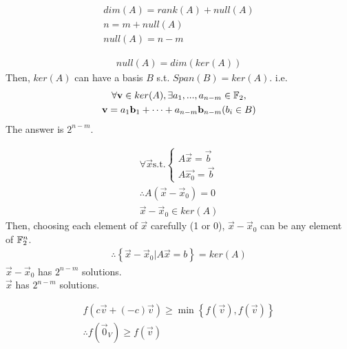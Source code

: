 \documentclass[1]{mathtoolkit}
\begin{document}
\maketitle

\begin{p}
  \item
    \begin{subp}
      \item
        \begin{gather}
          dim(A) = rank(A) + null(A) \\
          n = m + null(A) \\
          null(A) = n - m
        \end{gather}
      \item
        \begin{gather}
          null(A) = dim(ker(A))
        \end{gather}
        Then, $ker(A)$ can have a basis $B$ s.t. $Span(B) = ker(A)$.
        i.e.
        \begin{gather}
          \forall \mathbf{v} \in ker(A),
          \exists a_1, ..., a_{n-m} \in \mathbb{F}_2, \\
          \mathbf{v} = a_1 \mathbf{b}_1 + \dots + a_{n-m} \mathbf{b}_{n-m} (b_i \in B)
        \end{gather}
        \therefore The answer is $2^{n-m}$.
      \item
        \begin{gather}
          \forall \vec{x}
          \text{s.t.}
          \begin{cases}
            A \vec{x} = \vec{b} \\
            A \vec{x_0} = \vec{b}
          \end{cases} \\
          \therefore A (\vec{x} - \vec{x}_0) = 0 \\
          \vec{x} - \vec{x}_0 \in ker(A)
        \end{gather}
        Then, choosing each element of $\vec{x}$ carefully (1 or 0),
        $\vec{x} - \vec{x}_0$ can be any element of $\mathbb{F}^n_2$.
        \begin{gather}
          \therefore \left\{ \vec{x} - \vec{x}_0 | A \vec{x} = b \right\} = ker(A)
        \end{gather}
        \therefore $\vec{x} - \vec{x}_0$ has $2^{n-m}$ solutions. \\
        \therefore $\vec{x}$ has $2^{n-m}$ solutions. \\
    \end{subp}

  \item
    \begin{subp}
      \begin{gather}
        f(c \vec{v} + (-c) \vec{v}) \ge \min \left\{ f(\vec{v}), f(\vec{v}) \right\} \\
        \therefore f(\vec{0}_V) \ge f(\vec{v})
      \end{gather}
    \end{subp}
\end{p}
\end{document}
